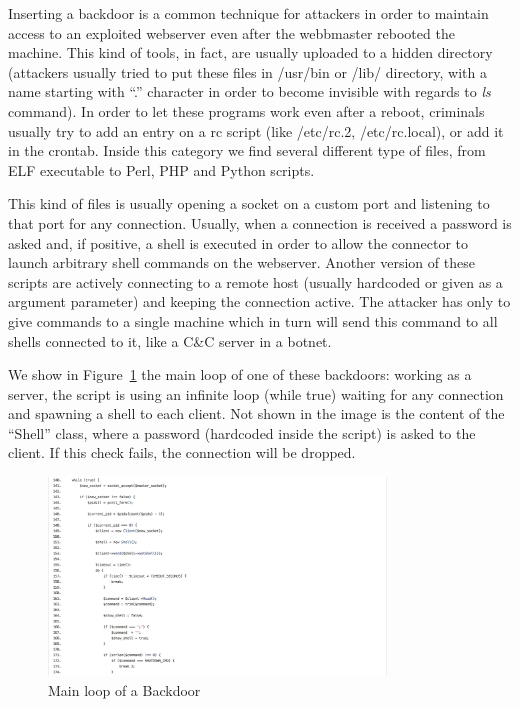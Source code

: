 Inserting a backdoor is a common technique for attackers in order to maintain access to an exploited webserver even after the webbmaster rebooted the machine. This kind of tools, in fact, are usually uploaded to a hidden directory (attackers usually tried to put these files in /usr/bin or /lib/ directory, with a name starting with ``.'' character in order to become invisible with regards to \emph{ls} command). In order to let these programs work even after a reboot, criminals usually try to add an entry on a rc script (like /etc/rc.2, /etc/rc.local), or add it in the crontab. Inside this category we find several different type of files, from ELF executable to Perl, PHP and Python scripts.

This kind of files is usually opening a socket on a custom port and listening to that port for any connection. Usually, when a connection is received a password is asked and, if positive, a shell is executed in order to allow the connector to launch arbitrary shell commands on the webserver. Another version of these scripts are actively connecting to a remote host (usually hardcoded or given as a argument parameter) and keeping the connection active. The attacker has only to give commands to a single machine which in turn will send this command to all shells connected to it, like a C\&C server in a botnet.

We show in Figure~\ref{fig:backDoor} the main loop of one of these backdoors: working as a server, the script is using an infinite loop (while true) waiting for any connection and spawning a shell to each client. Not shown in the image is the content of the ``Shell'' class, where a password (hardcoded inside the script) is asked to the client. If this check fails, the connection will be dropped.

\begin{figure}[H]
\centerline{\includegraphics[width=0.8\textwidth]{Images/backDoor.jpg}}
\caption{Main loop of a Backdoor\label{fig:backDoor}}
\end{figure}

